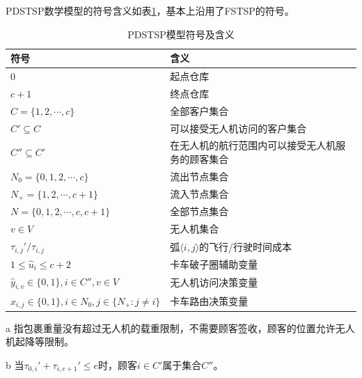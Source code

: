 PDSTSP数学模型的符号含义如表\ref{tab:pdstsp-sign-meaning}，基本上沿用了FSTSP的符号。

\begin{table}[!htbp]
    \begin{threeparttable}
    \centering
    \caption{PDSTSP模型符号及含义}
    \label{tab:pdstsp-sign-meaning}
    \begin{tabularx}{\textwidth}{lX}
        \toprule[1pt] %
        符号 & 含义 \\
        \midrule[0.75pt] %
        $0$ & 起点仓库 \\
        $c + 1$ & 终点仓库 \\
        $C=\{1,2,\cdots,c\}$ & 全部客户集合 \\
        $C' \subseteq C$ & 可以接受无人机访问的客户集合\hyperlink{tab:pdstsp-item-1}{\tnote{a}}\\
        $C'' \subseteq C'$ & 在无人机的航行范围内可以接受无人机服务的顾客集合\hyperlink{tab:pdstsp-item-2}{\tnote{b}}\\ 
        $N_0 = \{0,1,2,\cdots,c\}$ & 流出节点集合 \\
        $N_+ = \{1,2,\cdots,c + 1\}$ & 流入节点集合 \\
        $N = \{0,1,2,\cdots,c,c + 1\}$ & 全部节点集合 \\
        $v \in V$ & 无人机集合\\ 
        $\tau_{i,j}'/\tau_{i,j}$ & 弧$\langle i,j\rangle$的飞行/行驶时间成本 \\
        $1 \leq \hat{u}_i \leq c + 2$ & 卡车破子圈辅助变量 \\
        $\hat{y}_{i,v} \in \{0, 1\}, i \in C'', v\in V$ & 无人机访问决策变量\\ 
        $\hat{x}_{i,j} \in \{0, 1\}, i \in N_0, j \in \{N_+:j\neq i\}$ & 卡车路由决策变量\\ 
        \bottomrule[1pt] %
    \end{tabularx}
    \begin{tablenotes}
        \footnotesize %
        \item[a] \hypertarget{tab:pdstsp-item-1}{}指包裹重量没有超过无人机的载重限制，不需要顾客签收，顾客的位置允许无人机起降等限制。
        \item[b] \hypertarget{tab:pdstsp-item-2}{}当$\tau_{0,i}'+\tau_{i,c+1}'\leq e$时，顾客$i \in C'$属于集合$C''$。
    \end{tablenotes}
    \end{threeparttable}
\end{table}
\hyperlink{tab:fstsp-item-4}{}



